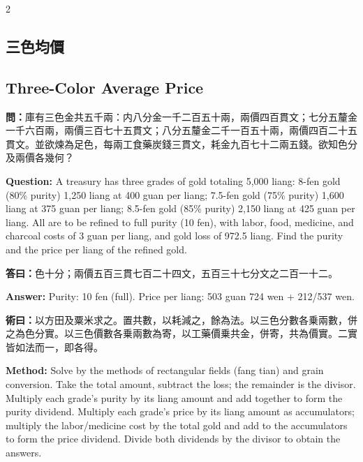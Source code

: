 \documentclass[11pt,a4paper]{article}
\newcommand{\QuestionText}[1]{\par\noindent\textbf{\color{problemcolor}問：}#1\par}
\newcommand{\AnswerText}[1]{\par\noindent\textbf{\color{answercolor}答曰：}#1\par}
\newcommand{\MethodText}[1]{\par\noindent\textbf{\color{methodcolor}術曰：}#1\par}
\newcommand{\QuestionEn}[1]{\par\noindent\textbf{\color{problemcolor}Question:} #1\par}
\newcommand{\AnswerEn}[1]{\par\noindent\textbf{\color{answercolor}Answer:} #1\par}
\newcommand{\MethodEn}[1]{\par\noindent\textbf{\color{methodcolor}Method:} #1\par}
\begin{document}
\begin{paracol}{2}

\subsection*{\color{sectioncolor}三色均價}
\switchcolumn
\subsection*{\color{sectioncolor}Three-Color Average Price}
\switchcolumn*

\QuestionText{庫有三色金共五千兩：内八分金一千二百五十兩，兩價四百貫文；七分五釐金一千六百兩，兩價三百七十五貫文；八分五釐金二千一百五十兩，兩價四百二十五貫文。並欲煉為足色，每兩工食藥炭錢三貫文，耗金九百七十二兩五錢。欲知色分及兩價各幾何？}
\switchcolumn
\QuestionEn{A treasury has three grades of gold totaling 5,000 liang: 8-fen gold (80\% purity) 1,250 liang at 400 guan per liang; 7.5-fen gold (75\% purity) 1,600 liang at 375 guan per liang; 8.5-fen gold (85\% purity) 2,150 liang at 425 guan per liang. All are to be refined to full purity (10 fen), with labor, food, medicine, and charcoal costs of 3 guan per liang, and gold loss of 972.5 liang. Find the purity and the price per liang of the refined gold.}
\switchcolumn*

\AnswerText{色十分；兩價五百三貫七百二十四文，五百三十七分文之二百一十二。}
\switchcolumn
\AnswerEn{Purity: 10 fen (full). Price per liang: 503 guan 724 wen + 212/537 wen.}
\switchcolumn*

\MethodText{以方田及粟米求之。置共數，以耗減之，餘為法。以三色分數各乗兩數，併之為色分實。以三色價數各乗兩數為寄，以工藥價乗共金，併寄，共為價實。二實皆如法而一，即各得。}
\switchcolumn
\MethodEn{Solve by the methods of rectangular fields (fang tian) and grain conversion. Take the total amount, subtract the loss; the remainder is the divisor. Multiply each grade's purity by its liang amount and add together to form the purity dividend. Multiply each grade's price by its liang amount as accumulators; multiply the labor/medicine cost by the total gold and add to the accumulators to form the price dividend. Divide both dividends by the divisor to obtain the answers.}
\switchcolumn*


\end{paracol}
\end{document}
